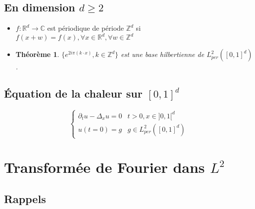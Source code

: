 \documentclass[10pt,a4paper,oneside]{article}
\newtheorem{theoreme}{Théorème}
\begin{document}
\subsection{En dimension $d \geq 2$}

\begin{itemize}

\item
$f : \mathbb{R}^d \to \mathbb{C}$ est périodique de période $\mathbb{Z}^d$ si $f(x + w) = f(x), \forall x \in \mathbb{R}^d, \forall w \in \mathbb{Z}^d$

\item
\begin{theoreme}
$\{ e^{2i \pi (k \cdot x)}, k \in \mathbb{Z}^d \}$ est une base hilbertienne de $L_{per}^2([0,1]^d)$.
\end{theoreme}

\end{itemize}

\subsection{Équation de la chaleur sur $[0,1]^d$}

\[ \begin{cases}
\partial_t u - \Delta_x u = 0 & t > 0,x \in ]0,1[^d \\
u(t = 0) = g & g \in L_{per}^2([0,1]^d)
\end{cases} \]

\section{Transformée de Fourier dans $L^2$}

\subsection{Rappels}
\end{document}

